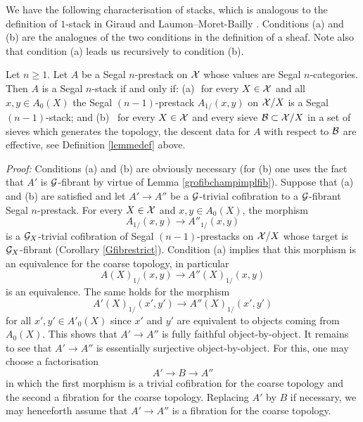 
We have the following characterisation of stacks, which is analogous to the
definition of $1$-stack in Giraud \cite{GiraudThese} and
Laumon--Moret-Bailly \cite{LaumonMB}. Conditions (a) and (b) are the analogues
of the two conditions in the definition of a sheaf. Note also that condition
(a) leads us recursively to condition (b).


\begin{proposition}
\label{critere}
Let $n\geq 1$.
Let $A$ be a Segal $n$-prestack on ${\cal X}$ whose values are Segal $n$-categories.
Then $A$ is a Segal $n$-stack if and only if:
\newline
(a)\,\, for every $X\in {\cal X}$ and all $x,y\in A_0(X)$ the Segal
$(n-1)$-prestack $A_{1/}(x,y)$ on ${\cal X} /X$ is a Segal $(n-1)$-stack; and
\newline
(b) \, for every $X\in {\cal X}$ and every sieve ${\cal B} \subset {\cal X} /X$ in a set of
sieves which generates the topology, the descent data for $A$ with respect to
${\cal B}$ are effective, see Definition \ref{lemmedef} above.
\end{proposition}
{\em Proof:}
Conditions (a) and (b) are obviously necessary (for (b) one uses the fact that
$A'$ is ${\cal G}$-fibrant by virtue of Lemma \ref{grofibchampimplfib}).
Suppose that (a) and (b) are satisfied and let $A'\rightarrow A''$ be a
${\cal G}$-trivial cofibration to a ${\cal G}$-fibrant Segal $n$-prestack. For every
$X\in {\cal X}$ and $x,y\in A_0(X)$, the morphism
$$
A_{1/} (x,y)\rightarrow         A''_{1/}(x,y)
$$
is a ${\cal G}_X$-trivial cofibration of Segal $(n-1)$-prestacks on ${\cal X} /X$ whose
target is ${\cal G} _X$-fibrant (Corollary \ref{Gfibrestrict}). Condition (a)
implies that this morphism is an equivalence for the coarse topology, in
particular
$$
A(X)_{1/} (x,y)\rightarrow      A''(X)_{1/}(x,y)
$$
is an equivalence. The same holds for the morphism
$$
A'(X)_{1/} (x',y')\rightarrow  A''(X)_{1/}(x',y')
$$
for all $x',y'\in A'_0(X)$ since $x'$ and $y'$ are equivalent to objects
coming from $A_0(X)$. This shows that $A'\rightarrow A''$ is fully faithful
object-by-object. It remains to see that $A'\rightarrow A''$ is essentially
surjective object-by-object. For this, one may choose a factorisation
$$
A'\rightarrow B \rightarrow A''
$$
in which the first morphism is a trivial cofibration for the coarse topology
and the second a fibration for the coarse topology. Replacing $A'$ by $B$ if
necessary, we may henceforth assume that $A'\rightarrow A''$ is a fibration
for the coarse topology.

